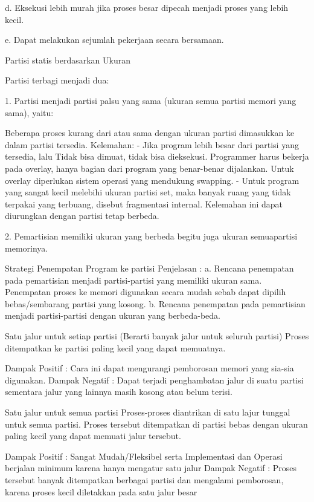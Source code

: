 	d. Eksekusi lebih murah jika proses besar dipecah menjadi proses yang lebih kecil.

	e. Dapat melakukan sejumlah pekerjaan secara bersamaan.


Partisi statis berdasarkan Ukuran

Partisi terbagi menjadi dua:

1. Partisi menjadi partisi palsu yang sama (ukuran semua partisi
memori yang sama), yaitu:

Beberapa proses kurang dari atau sama dengan ukuran partisi dimasukkan ke dalam partisi tersedia.
Kelemahan:
	- Jika program lebih besar dari partisi yang tersedia, lalu Tidak bisa dimuat, tidak bisa dieksekusi. Programmer harus bekerja pada overlay, hanya bagian dari program yang benar-benar dijalankan. Untuk overlay diperlukan sistem operasi yang mendukung swapping.
	- Untuk program yang sangat kecil melebihi ukuran partisi set, maka banyak ruang yang tidak terpakai yang terbuang, disebut fragmentasi internal. Kelemahan ini dapat diurungkan dengan partisi tetap berbeda.

2. Pemartisian memiliki ukuran yang berbeda begitu juga ukuran semuapartisi memorinya.

Strategi Penempatan Program ke partisi
Penjelasan :
a. Rencana penempatan pada pemartisian menjadi partisi-partisi yang memiliki ukuran sama. Penempatan proses ke memori digunakan secara mudah sebab dapat dipilih bebas/sembarang partisi yang kosong.
b. Rencana penempatan pada pemartisian menjadi partisi-partisi dengan ukuran yang berbeda-beda.

Satu jalur untuk setiap partisi (Berarti banyak jalur untuk seluruh partisi) Proses ditempatkan ke partisi paling kecil yang dapat memuatnya.

Dampak Positif : Cara ini dapat mengurangi pemborosan memori yang sia-sia digunakan.
Dampak Negatif : Dapat terjadi penghambatan jalur di suatu partisi sementara jalur yang lainnya masih kosong atau belum terisi.

Satu jalur untuk semua partisi Proses-proses diantrikan di satu lajur tunggal untuk semua partisi. Proses tersebut ditempatkan di partisi bebas dengan ukuran paling kecil yang dapat memuati jalur tersebut.

Dampak Positif : Sangat Mudah/Fleksibel serta Implementasi dan Operasi berjalan minimum karena hanya mengatur satu jalur
Dampak Negatif : Proses tersebut banyak ditempatkan berbagai partisi dan mengalami pemborosan, karena proses kecil diletakkan pada satu jalur besar

